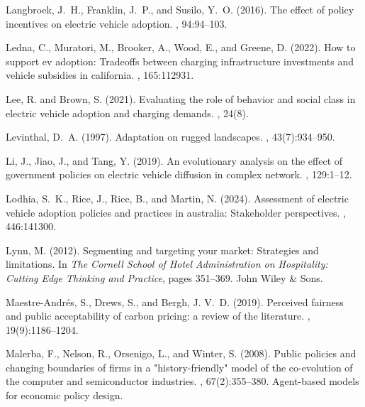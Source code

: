 \documentclass[12pt]{article}
\begin{document}
\begin{thebibliography}{}
Langbroek, J.~H., Franklin, J.~P., and Susilo, Y.~O. (2016).
\newblock The effect of policy incentives on electric vehicle adoption.
, 94:94--103.

Ledna, C., Muratori, M., Brooker, A., Wood, E., and Greene, D. (2022).
\newblock How to support ev adoption: Tradeoffs between charging infrastructure
  investments and vehicle subsidies in california.
, 165:112931.

Lee, R. and Brown, S. (2021).
\newblock Evaluating the role of behavior and social class in electric vehicle
  adoption and charging demands.
, 24(8).

Levinthal, D.~A. (1997).
\newblock Adaptation on rugged landscapes.
, 43(7):934--950.

Li, J., Jiao, J., and Tang, Y. (2019).
\newblock An evolutionary analysis on the effect of government policies on
  electric vehicle diffusion in complex network.
, 129:1--12.

Lodhia, S.~K., Rice, J., Rice, B., and Martin, N. (2024).
\newblock Assessment of electric vehicle adoption policies and practices in
  australia: Stakeholder perspectives.
, 446:141300.

Lynn, M. (2012).
\newblock Segmenting and targeting your market: Strategies and limitations.
\newblock In {\em The Cornell School of Hotel Administration on Hospitality:
  Cutting Edge Thinking and Practice}, pages 351--369. John Wiley \& Sons.

Maestre-Andr{\'e}s, S., Drews, S., and Bergh, J. V.~D. (2019).
\newblock Perceived fairness and public acceptability of carbon pricing: a
  review of the literature.
, 19(9):1186--1204.

Malerba, F., Nelson, R., Orsenigo, L., and Winter, S. (2008).
\newblock Public policies and changing boundaries of firms in a
  "history-friendly" model of the co-evolution of the computer and
  semiconductor industries.
, 67(2):355--380.
\newblock Agent-based models for economic policy design.


\end{thebibliography}
\end{document}
